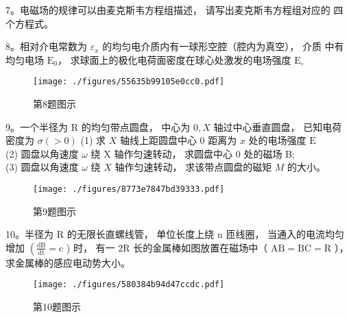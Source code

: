 7。电磁场的规律可以由麦克斯韦方程组描述， 请写出麦克斯韦方程组对应的 四个方程式。

8。相对介电常数为 $\varepsilon_{x}$ 的均匀电介质内有一球形空腔（腔内为真空）， 介质 中有均匀电场 $\mathrm{E}_{0}$， 求球面上的极化电荷面密度在球心处激发的电场强度 $\mathrm{E}_{\circ}$
\begin{figure}[ht]
\centering
\texttt{[image: ./figures/55635b99105e0cc0.pdf]}
\caption{第8题图示} \label{fig_BNU12_3}
\end{figure}

9。一个半径为 $\mathrm{R}$ 的均匀带点圆盘， 中心为 $0, X$ 轴过中心垂直圆盘， 已知电荷 密度为 $\sigma(>0)$
(1) 求 $X$ 轴线上距圆盘中心 0 距离为 $x$ 处的电场强度 $\mathrm{E} $\\
(2) 圆盘以角速度 $\omega$ 绕 $\mathrm{X}$ 轴作匀速转动， 求圆盘中心 0 处的磁场 B;\\
(3) 圆盘以角速度 $\omega$ 绕 $X$ 轴作匀速转动， 求该带点圆盘的磁矩 $M$ 的大小。
\begin{figure}[ht]
\centering
\texttt{[image: ./figures/8773e7847bd39333.pdf]}
\caption{第9题图示} \label{fig_BNU12_4}
\end{figure}

10。半径为 $\mathrm{R}$ 的无限长直螺线管， 单位长度上绕 $\mathrm{n}$ 匝线圈， 当通入的电流均匀
增加 $\left(\frac{\mathrm{dB}}{\mathrm{dt}}=\mathrm{c}\right.$ ) 时， 有一 $2 \mathrm{R}$ 长的金属棒如图放置在磁场中（ $\mathrm{AB}=\mathrm{BC}=\mathrm{R}$ ）， 求金属棒的感应电动势大小。
\begin{figure}[ht]
\centering
\texttt{[image: ./figures/580384b94d47ccdc.pdf]}
\caption{第10题图示} \label{fig_BNU12_5}
\end{figure}
